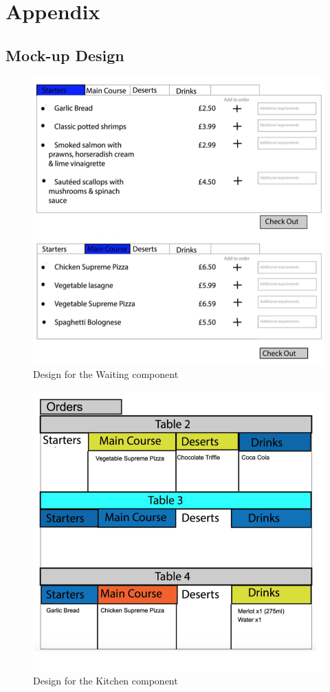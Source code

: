 \documentclass[11pt, a4paper]{report}
\begin{document}
\section{Appendix} 
\subsection{Mock-up Design}
\begin{figure}
\centering
\includegraphics[scale=0.65]{Figures/WaitStaffApp.png}
\caption{Design for the Waiting component}
\end{figure}
\begin{figure}
\centering
\includegraphics[scale=0.65]{Figures/KitchenDisplay.png}
\caption{Design for the Kitchen component}
\end{figure}
\end{document}
